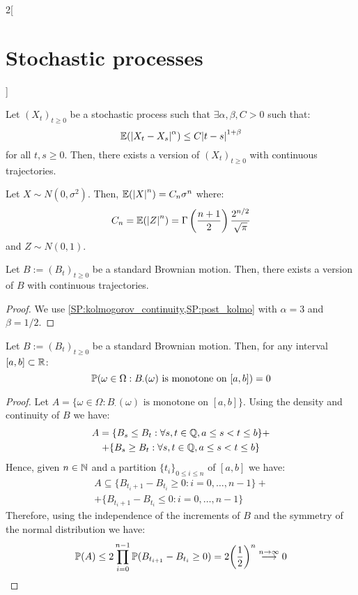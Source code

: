 \documentclass[../../../main_math.tex]{subfiles}
\begin{document}
\begin{multicols}{2}[\section{Stochastic processes}]
\begin{theorem}
    Let ${(X_t)}_{t\geq 0}$ be a stochastic process such that $\exists \alpha,\beta, C>0$ such that:
    $$
      \mathbb{E}(\abs{X_t-X_s}^\alpha)\leq C\abs{t-s}^{1+\beta}
    $$
    for all $t,s\geq 0$. Then, there exists a version of ${(X_t)}_{t\geq 0}$ with continuous trajectories.
  \end{theorem}
  \begin{lemma}\label{SP:post_kolmo}
    Let $X\sim N(0,\sigma^2)$. Then, $\mathbb{E}(\abs{X}^n)=C_n\sigma^n$ where:
    $$
      C_n=\mathbb{E}(\abs{Z}^n)=\Gamma\left(\frac{n+1}{2}\right)\frac{2^{n/2}}{\sqrt{\pi}}
    $$
    and $Z\sim N(0,1)$.
  \end{lemma}
  \begin{corollary}
    Let $B:={(B_t)}_{t\geq 0}$ be a standard Brownian motion. Then, there exists a version of $B$ with continuous trajectories.
  \end{corollary}
  \begin{proof}
    We use \cref{SP:kolmogorov_continuity,SP:post_kolmo} with $\alpha=3$ and $\beta=1/2$.
  \end{proof}
  \begin{proposition}
    Let $B:= {(B_t)}_{t\geq 0}$ be a standard Brownian motion. Then, for any interval $[a,b]\subset \mathbb{R}$:
    $$
      \mathbb{P}(\omega\in \Omega:B_\cdot(\omega)\text{ is monotone on }[a,b])=0
    $$
  \end{proposition}
  \begin{proof}
    Let $A=\{\omega\in\Omega:B_\cdot(\omega)\text{ is monotone on }[a,b]\}$. Using the density and continuity of $B$ we have:
    \begin{multline*}
      A=\{B_s\leq B_t:\forall s,t \in\mathbb{Q}, a\leq s< t\leq b\}+  \\+ \{B_s\geq B_t:\forall s,t \in\mathbb{Q}, a\leq s< t\leq b\}
    \end{multline*}
    Hence, given $n\in\mathbb{N}$ and a partition ${\{t_i\}}_{0\leq i\leq n}$ of $[a,b]$ we have:
    \begin{multline*}
      A\subseteq \{ B_{t_i+1} - B_{t_i}\geq 0: i=0,\ldots,n-1\}+ \\ + \{ B_{t_i+1} - B_{t_i}\leq 0: i=0,\ldots,n-1\}
    \end{multline*}
    Therefore, using the independence of the increments of $B$ and the symmetry of the normal distribution we have:
    $$
      \mathbb{P}(A)\leq 2\prod_{i=0}^{n-1} \mathbb{P}(B_{t_{i+1}}-B_{t_i}\geq 0)=2{\left(\frac{1}{2}\right)}^n\overset{n\to \infty}{\longrightarrow} 0
    $$
  \end{proof}
  \begin{proposition}

\end{proposition}
\end{multicols}
\end{document}
